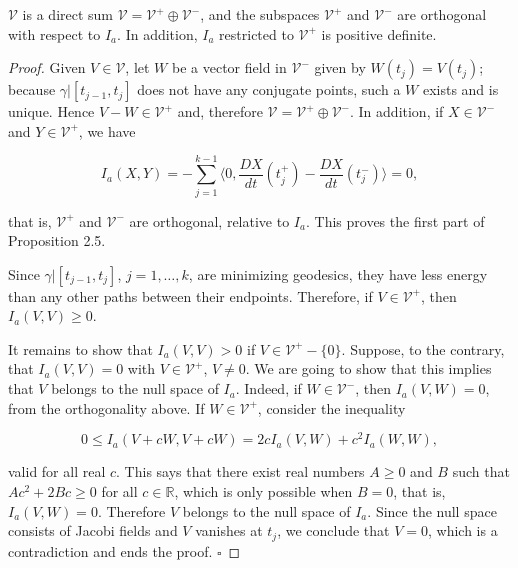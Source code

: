 \begin{proposition}[the splitting $\mathcal{V}=\mathcal{V}^+\oplus\mathcal{V}^-$]
  \label{prop:dc-ch11-2-5}
  $\mathcal{V}$ is a direct sum $\mathcal{V}=\mathcal{V}^+\oplus\mathcal{V}^-$, and
  the subspaces $\mathcal{V}^+$ and $\mathcal{V}^-$ are orthogonal with respect to
  $I_a$. In addition, $I_a$ restricted to $\mathcal{V}^+$ is positive definite.
\end{proposition}
\begin{proof}
  Given $V\in\mathcal{V}$, let $W$ be a vector field in $\mathcal{V}^-$
  given by $W(t_j)=V(t_j)$; because $\gamma|[t_{j-1},t_j]$ does not have any
  conjugate points, such a $W$ exists and is unique. Hence
  $V-W\in\mathcal{V}^+$ and, therefore $\mathcal{V}=\mathcal{V}^+\oplus\mathcal{V}^-$.
  In addition, if $X\in\mathcal{V}^-$ and $Y\in\mathcal{V}^+$, we have
  
  $$
  I_a(X,Y)=-\sum_{j=1}^{k-1}\Big\langle 0,\frac{DX}{dt}(t_j^+)-\frac{DX}{dt}(t_j^-)\Big\rangle=0,
  $$
  
  that is, $\mathcal{V}^+$ and $\mathcal{V}^-$ are orthogonal, relative to $I_a$.
  This proves the first part of Proposition 2.5.
  
  Since $\gamma|[t_{j-1},t_j]$, $j=1,\dots,k$, are minimizing geodesics, they have
  less energy than any other paths between their endpoints. Therefore, if
  $V\in\mathcal{V}^+$, then $I_a(V,V)\geq 0$.
  
  It remains to show that $I_a(V,V)>0$ if $V\in\mathcal{V}^+-\{0\}$. Suppose, to
  the contrary, that $I_a(V,V)=0$ with $V\in\mathcal{V}^+$, $V\neq 0$. We are going
  to show that this implies that $V$ belongs to the null space of $I_a$. Indeed,
  if $W\in\mathcal{V}^-$, then $I_a(V,W)=0$, from the orthogonality above. If
  $W\in\mathcal{V}^+$, consider the inequality
  
  $$
  0\leq I_a(V+cW,V+cW)=2cI_a(V,W)+c^2 I_a(W,W),
  $$
  
  valid for all real $c$. This says that there exist real numbers $A\geq 0$ and
  $B$ such that $Ac^2+2Bc\geq 0$ for all $c\in\mathbb{R}$, which is only possible
  when $B=0$, that is, $I_a(V,W)=0$. Therefore $V$ belongs to the null space of
  $I_a$. Since the null space consists of Jacobi fields and $V$ vanishes at $t_j$,
  we conclude that $V=0$, which is a contradiction and ends the proof. $\square$
\end{proof}

